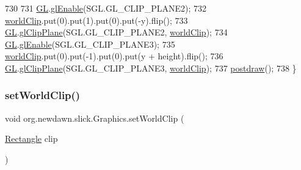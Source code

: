 \begin{DoxyCode}
730 
731         \mbox{\hyperlink{classorg_1_1newdawn_1_1slick_1_1_graphics_a39ca68db81b225982a4421c4a6835eed}{GL}}.\mbox{\hyperlink{interfaceorg_1_1newdawn_1_1slick_1_1opengl_1_1renderer_1_1_s_g_l_a35991f93081980b303d6ccc5bd88c8da}{glEnable}}(SGL.GL\_CLIP\_PLANE2);
732         \mbox{\hyperlink{classorg_1_1newdawn_1_1slick_1_1_graphics_a7831d10e767b65c7583e1b78a354318b}{worldClip}}.put(0).put(1).put(0).put(-y).flip();
733         \mbox{\hyperlink{classorg_1_1newdawn_1_1slick_1_1_graphics_a39ca68db81b225982a4421c4a6835eed}{GL}}.\mbox{\hyperlink{interfaceorg_1_1newdawn_1_1slick_1_1opengl_1_1renderer_1_1_s_g_l_aa0ecf8896be6f072c3d38372179071f8}{glClipPlane}}(SGL.GL\_CLIP\_PLANE2, \mbox{\hyperlink{classorg_1_1newdawn_1_1slick_1_1_graphics_a7831d10e767b65c7583e1b78a354318b}{worldClip}});
734         \mbox{\hyperlink{classorg_1_1newdawn_1_1slick_1_1_graphics_a39ca68db81b225982a4421c4a6835eed}{GL}}.\mbox{\hyperlink{interfaceorg_1_1newdawn_1_1slick_1_1opengl_1_1renderer_1_1_s_g_l_a35991f93081980b303d6ccc5bd88c8da}{glEnable}}(SGL.GL\_CLIP\_PLANE3);
735         \mbox{\hyperlink{classorg_1_1newdawn_1_1slick_1_1_graphics_a7831d10e767b65c7583e1b78a354318b}{worldClip}}.put(0).put(-1).put(0).put(y + height).flip();
736         \mbox{\hyperlink{classorg_1_1newdawn_1_1slick_1_1_graphics_a39ca68db81b225982a4421c4a6835eed}{GL}}.\mbox{\hyperlink{interfaceorg_1_1newdawn_1_1slick_1_1opengl_1_1renderer_1_1_s_g_l_aa0ecf8896be6f072c3d38372179071f8}{glClipPlane}}(SGL.GL\_CLIP\_PLANE3, \mbox{\hyperlink{classorg_1_1newdawn_1_1slick_1_1_graphics_a7831d10e767b65c7583e1b78a354318b}{worldClip}});
737         \mbox{\hyperlink{classorg_1_1newdawn_1_1slick_1_1_graphics_abe054371d1486618ff327bbbcf02ff97}{postdraw}}();
738     \}
\end{DoxyCode}
\mbox{\label{classorg_1_1newdawn_1_1slick_1_1_graphics_aad20f40f216344f260cc2bb4d81bc943}} 
\subsubsection{\texorpdfstring{set\+World\+Clip()}{setWorldClip()}\hspace{0.1cm}{\footnotesize\ttfamily [2/2]}}
{\footnotesize\ttfamily void org.\+newdawn.\+slick.\+Graphics.\+set\+World\+Clip (\begin{DoxyParamCaption}\item[{\mbox{\hyperlink{classorg_1_1newdawn_1_1slick_1_1geom_1_1_rectangle}{Rectangle}}}]{clip }\end{DoxyParamCaption})\hspace{0.3cm}{\ttfamily [inline]}}


